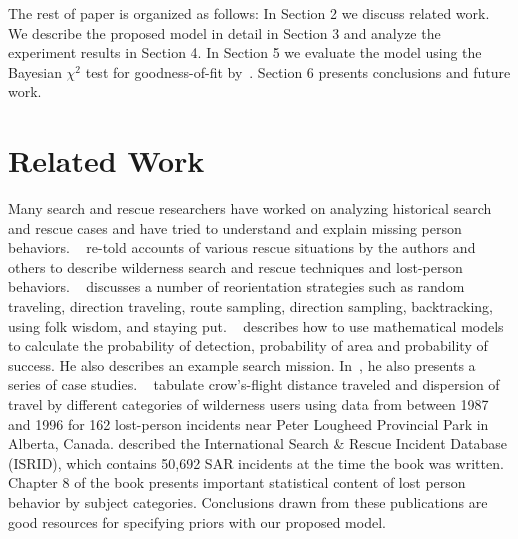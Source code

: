 \documentclass[smallextended,natbib]{svjour3}
\begin{document}
The rest of paper is organized as follows: In Section 2 we discuss related work. We describe the proposed model in detail in Section 3 and analyze the experiment results in Section 4. In Section 5 we evaluate the model using the Bayesian $\chi^2$ test for goodness-of-fit by~\cite{Chi-squaredTest}. Section 6 presents conclusions and future work.

\section{Related Work}
\label{sec:2}

Many search and rescue researchers have worked on analyzing historical search and rescue cases and have tried to understand and explain missing person behaviors. ~\cite{[01UAVSpecific]SetnickaWiSAR} re-told accounts of various rescue situations by the authors and others to describe wilderness search and rescue techniques and lost-person behaviors. ~\cite{[01UAVSpecific]PsychologyOfLost} discusses a number of reorientation strategies such as random traveling, direction traveling, route sampling, direction sampling, backtracking, using folk wisdom, and staying put. ~\cite{[01UAVSpecific]SyrotuckIntroToLandSearch} describes how to use mathematical models to calculate the probability of detection, probability of area and probability of success. He also describes an example search mission. In~\cite{AnalysisOfLostPersonBehavior}, he also presents a series of case studies. ~\cite{CanadaSAR} tabulate crow's-flight distance traveled and dispersion of travel by different categories of wilderness users using data from between 1987 and 1996 for 162 lost-person incidents near Peter Lougheed Provincial Park in Alberta, Canada. \cite{LostPersonBehavior} described the International Search \& Rescue Incident Database (ISRID), which contains 50,692 SAR incidents at the time the book was written. Chapter 8 of the book presents important statistical content of lost person behavior by subject categories. Conclusions drawn from these publications are good resources for specifying priors with our proposed model.
\end{document}
